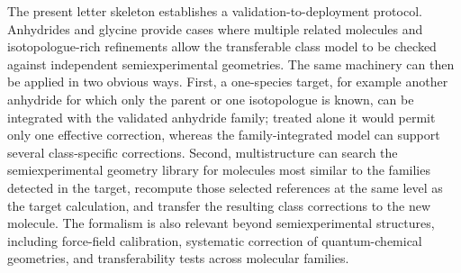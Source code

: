 \documentclass[journal=jpclcd,manuscript=letter]{achemso}
\begin{document}
The present letter skeleton establishes a validation-to-deployment protocol.\cite{morpheus_ensemble_working}  Anhydrides and glycine provide cases where multiple related molecules and isotopologue-rich refinements allow the transferable class model to be checked against independent semiexperimental geometries.  The same machinery can then be applied in two obvious ways.  First, a one-species target, for example another anhydride for which only the parent or one isotopologue is known, can be integrated with the validated anhydride family; treated alone it would permit only one effective correction, whereas the family-integrated model can support several class-specific corrections.  Second, multistructure can search the semiexperimental geometry library for molecules most similar to the families detected in the target, recompute those selected references at the same level as the target calculation, and transfer the resulting class corrections to the new molecule.  The formalism is also relevant beyond semiexperimental structures, including force-field calibration, systematic correction of quantum-chemical geometries, and transferability tests across molecular families.


\end{document}
